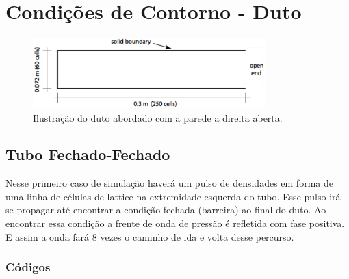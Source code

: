 \chapter{Condições de Contorno - Duto}\label{parte_1}

\begin{figure}[h!]
    \centering
    \hspace{-1.5cm}
    \includegraphics[width=0.8\textwidth]{figuras/duto.eps}
    \caption{Ilustração do duto abordado com a parede a direita aberta.}
\end{figure}

\section{Tubo Fechado-Fechado}
Nesse primeiro caso de simulação haverá um pulso de densidades em forma de uma linha de células de lattice na extremidade esquerda do tubo. Esse pulso irá se propagar até encontrar a condição fechada (barreira) ao final do duto. Ao encontrar essa condição a frente de onda de pressão é refletida com fase positiva. E assim a onda fará 8 vezes o caminho de ida e volta desse percurso. 

\subsection{Códigos}








